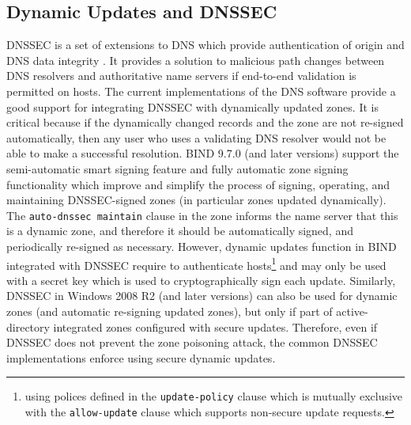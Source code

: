 \subsection{Dynamic Updates and DNSSEC}
DNSSEC is a set of extensions to DNS which provide %
authentication of origin and DNS data integrity \cite{rfc4033}.
It provides a solution to malicious path changes between DNS resolvers and authoritative name servers if end-to-end validation is permitted on hosts. 
The current implementations of the DNS software provide a good support for integrating DNSSEC with dynamically updated zones.
It is critical because if the dynamically changed records and the zone are not re-signed automatically, then any user who uses a validating DNS resolver would not be able to make a successful resolution.
BIND 9.7.0 (and later versions) support the semi-automatic smart signing feature and fully automatic zone signing functionality which improve and simplify the process of signing, operating, and maintaining DNSSEC-signed zones (in particular zones updated dynamically).
The \texttt{auto-dnssec maintain} clause in the zone informs the name server that this is a dynamic zone, and therefore it should be automatically signed, and periodically re-signed as necessary.
However, dynamic updates function in BIND integrated with DNSSEC require to authenticate hosts\footnote{using polices defined in the \texttt{update-policy} clause which is mutually exclusive with the \texttt{allow-update} clause which supports non-secure update requests.} and may only be used with a secret key %
which is used to cryptographically sign each update.
Similarly, DNSSEC in %
Windows 2008 R2 (and later versions) can also be used for dynamic zones (and automatic re-signing updated zones), but only if part of active-directory integrated zones configured with secure updates.
Therefore, even if DNSSEC does not prevent the zone poisoning attack, the common DNSSEC implementations enforce using secure dynamic updates.